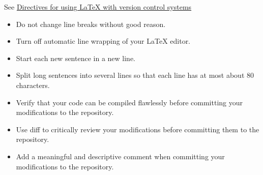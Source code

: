 See \href{https://en.wikibooks.org/wiki/LaTeX/Collaborative_Writing_of_LaTeX_Documents\#Subversion_really_makes_the_difference}{Directives for using LaTeX with version control systems}
\begin{itemize}
\item Do not change line breaks without good reason.
\item Turn off automatic line wrapping of your LaTeX editor.
\item Start each new sentence in a new line.
\item Split long sentences into several lines so that each line has at most about 80 characters.
\item Verify that your code can be compiled flawlessly before committing your modifications to the repository.
\item Use diff to critically review your modifications before committing them to the repository.
\item Add a meaningful and descriptive comment when committing your modifications to the repository.
\end{itemize}
